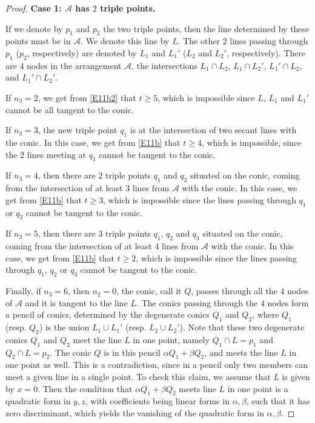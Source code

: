 \documentclass[12pt]{amsart}
\theoremstyle{plain}
\theoremstyle{definition}
\numberwithin{equation}{section}
\newcommand{\al}{{\alpha}}
\newcommand{\be}{{\beta}}
\begin{document}
\begin{proof}
\medskip

{\bf Case 1: $\mathcal{A}$ has $2$ triple points.}

\medskip

If we denote by $p_1$ and $p_2$ the two triple points, then the line determined by these points must be in $\mathcal{A}$. We denote this line by $L$. The other $2$ lines passing through $p_1$ ($p_2$, respectively) are denoted by $L_1$ and $L_1'$ ($L_2$ and $L_2'$, respectively). There are $4$ nodes in the arrangement $\mathcal{A}$, the intersections $L_1 \cap L_2$, $L_1 \cap L_2'$,
$L_1' \cap L_2$, and $L_1' \cap L_2'$.

If $n_3=2$, we get from \eqref{E11b2} that $t \geq 5$, which is impossible since $L$, $L_1$ and $L_1'$ cannot be all tangent to the conic.

If $n_3=3$, the new triple point $q_1$ is at the intersection of two secant lines with the conic. In this case, we get from \eqref{E11b} that $t \geq 4$, which is impossible, since the $2$ lines meeting at $q_1$ cannot be tangent to the conic.

If $n_3=4$, then there are $2$ triple points $q_1$ and $q_2$ situated on the conic, coming from the intersection of at least $3$ lines from $\mathcal{A}$ with the conic. In this case, we get from \eqref{E11b} that $t \geq 3$, which is impossible since the lines passing through $q_1$ or $q_2$ cannot be tangent to the conic.

If $n_3=5$, then there are $3$ triple points $q_1$, $q_2$ and $q_3$ situated on the conic, coming from the intersection of at least $4$ lines from $\mathcal{A}$ with the conic. In this case, we get from \eqref{E11b} that $t \geq 2$, which is impossible since the lines passing through $q_1$, $q_2$ or $q_3$ cannot be tangent to the conic.

Finally, if $n_3=6$, then $n_2=0$, the conic, call it $Q$, passes through all the $4$ nodes of $\mathcal{A}$ and it is tangent to the line $L$. The conics passing through the $4$ nodes form a pencil of conics, determined by the degenerate conics $Q_1$ and $Q_2$, where $Q_1$ (resp. $Q_2$) is  the union $L_1 \cup L_1'$ (resp. $L_2 \cup L_2'$).
Note that these two degenerate conics $Q_1$ and $Q_2$ meet the line $L$ in one point, namely $Q_1\cap L=p_1$ and $Q_2\cap L=p_2$.
The conic $Q$ is in this pencil $\al Q_1 + \be Q_2$, and meets
the line $L$ in one point as well. This is a contradiction, since in a pencil only two members can meet a given line in a single point. To check this claim, we assume that $L$ is given by $x=0$. Then the condition that $\al Q_1 + \be Q_2$ meets
line $L$ in one point is a quadratic form in $y,z$, with coefficients being linear forms in $\al, \be$, such that it has zero discriminant, which yields the vanishing of the quadratic form in $\al, \be$.


\end{proof}
\end{document}
